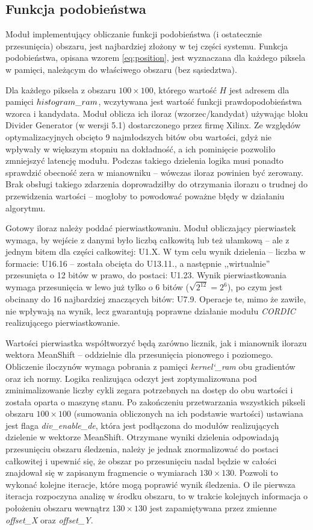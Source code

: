 \subsection{Funkcja podobieństwa}

Moduł implementujący obliczanie funkcji podobieństwa (i ostatecznie przesunięcia) obszaru, jest najbardziej złożony w tej części systemu. 
Funkcja podobieństwa, opisana wzorem \eqref{eq:position}, jest wyznaczana dla każdego piksela w pamięci, należącym do właściwego obszaru (bez sąsiedztwa). 

Dla każdego piksela z obszaru $100 \times 100$, którego wartość $H$ jest adresem dla pamięci $histogram\char`_ram$, wczytywana jest wartość funkcji prawdopodobieństwa wzorca i kandydata. 
Moduł oblicza ich iloraz (wzorzec/kandydat) używając bloku Divider Generator (w wersji 5.1) dostarczonego przez firmę Xilinx.
Ze względów optymalizacyjnych obcięto 9 najmłodszych bitów obu wartości, gdyż nie wpływały w większym stopniu na dokładność, a ich pominięcie pozwoliło zmniejszyć latencję modułu.
Podczas takiego dzielenia logika musi ponadto sprawdzić obecność zera w mianowniku -- wówczas iloraz powinien być zerowany. 
Brak obsługi takiego zdarzenia doprowadziłby do otrzymania ilorazu o trudnej do przewidzenia wartości -- mogłoby to powodować poważne błędy w działaniu algorytmu. 

Gotowy iloraz należy poddać pierwiastkowaniu. 
Moduł obliczający pierwiastek wymaga, by wejście z danymi było liczbą całkowitą lub  też ułamkową -- ale z jednym bitem dla części całkowitej: U1.X. 
W tym celu wynik dzielenia -- liczba w formacie: U16.16 -- została obcięta do U13.11., a następnie ,,wirtualnie'' przesunięta o 12 bitów w prawo, do postaci: U1.23. 
Wynik pierwiastkowania wymaga przesunięcia w lewo już tylko o 6 bitów ($\sqrt{2^{12}}=2^6$), po czym jest obcinany do 16 najbardziej znaczących bitów: U7.9.
Operacje te, mimo że zawiłe, nie wpływają na wynik, lecz gwarantują poprawne działanie modułu \textit{CORDIC} realizującego pierwiastkowanie.

Wartości pierwiastka współtworzyć będą zarówno licznik, jak i mianownik ilorazu wektora MeanShift -- oddzielnie dla przesunięcia pionowego i poziomego.
Obliczenie iloczynów wymaga pobrania z pamięci \textit{kernel\char`_ram} obu gradientów oraz ich normy. 
Logika realizująca odczyt jest zoptymalizowana pod zminimalizowanie liczby cykli zegara potrzebnych na dostęp do obu wartości i została oparta o maszynę stanu. %
Po zakończeniu przetwarzania wszystkich pikseli obszaru $100 \times 100$ (sumowania obliczonych na ich podstawie wartości) ustawiana jest flaga \textit{div\_enable\_de}, która jest podłączona do modułów realizujących dzielenie w wektorze MeanShift. 
Otrzymane wyniki dzielenia odpowiadają przesunięciu obszaru śledzenia, należy je jednak znormalizować do postaci całkowitej i upewnić się, że obszar po przesunięciu nadal będzie w całości znajdował się w zapisanym fragmencie o wymiarach $130 \times 130$. 
Pozwoli to wykonać kolejne iteracje, które mogą poprawić wynik śledzenia. 
O ile pierwsza iteracja rozpoczyna analizę w środku obszaru, to w trakcie kolejnych informacja o położeniu obszaru wewnątrz $130 \times 130$ jest zapamiętywana przez zmienne \textit{offset\_X} oraz \textit{offset\_Y}.


